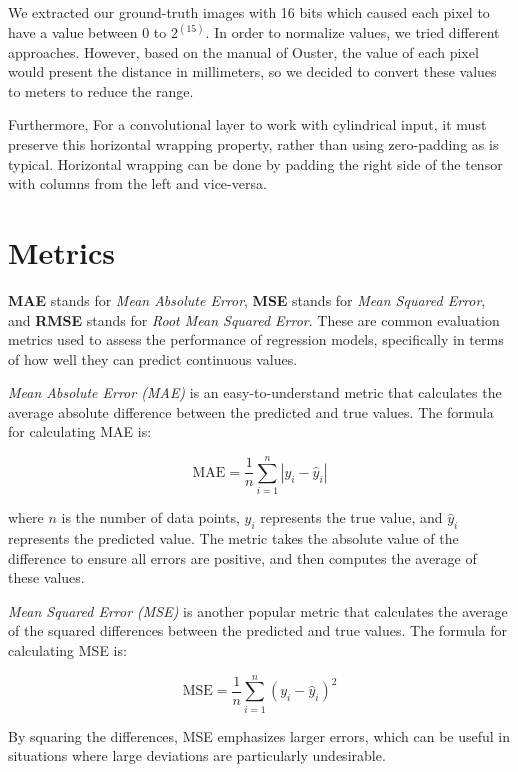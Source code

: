 \documentclass[english, LaM, oneside]{sapthesis}%
\begin{document}
We extracted our ground-truth images with 16 bits which caused each pixel to have a value between 0 to $2^{(15)}$. In order to normalize values, we tried different approaches. However, based on the manual of Ouster, the value of each pixel would present the distance in millimeters, so we decided to convert these values to meters to reduce the range. 

Furthermore, For a convolutional layer to work with cylindrical input, it must preserve this horizontal wrapping property, rather than using zero-padding as is typical. Horizontal wrapping can be done by padding the right side of the tensor with columns from the left and vice-versa. 

\section{Metrics}
\textbf{MAE} stands for \textit{Mean Absolute Error}, \textbf{MSE} stands for \textit{Mean Squared Error}, and \textbf{RMSE} stands for \textit{Root Mean Squared Error}. These are common evaluation metrics used to assess the performance of regression models, specifically in terms of how well they can predict continuous values.

\textit{Mean Absolute Error (MAE)} is an easy-to-understand metric that calculates the average absolute difference between the predicted and true values. The formula for calculating MAE is:

\begin{equation}
\text{MAE} = \frac{1}{n} \sum_{i=1}^n |y_i - \hat{y}_i|
\end{equation}

where $n$ is the number of data points, $y_i$ represents the true value, and $\hat{y}_i$ represents the predicted value. The metric takes the absolute value of the difference to ensure all errors are positive, and then computes the average of these values.

\textit{Mean Squared Error (MSE)} is another popular metric that calculates the average of the squared differences between the predicted and true values. The formula for calculating MSE is:

\begin{equation}
\text{MSE} = \frac{1}{n} \sum_{i=1}^n (y_i - \hat{y}_i)^2
\end{equation}

By squaring the differences, MSE emphasizes larger errors, which can be useful in situations where large deviations are particularly undesirable.
\end{document}
